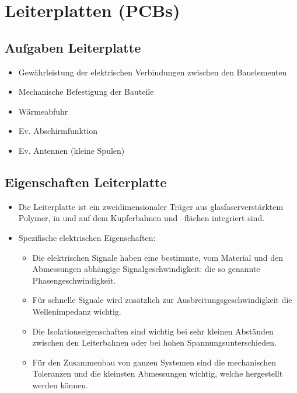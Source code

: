 \section{Leiterplatten (PCBs)}
\subsection{Aufgaben Leiterplatte}
\begin{itemize}
  \item Gewährleistung der elektrischen Verbindungen zwischen den Bauelementen
  \item Mechanische Befestigung der Bauteile
  \item Wärmeabfuhr
  \item Ev. Abschirmfunktion
  \item Ev. Antennen (kleine Spulen)
\end{itemize}

\subsection{Eigenschaften Leiterplatte}
\begin{itemize}
  \item Die Leiterplatte ist ein zweidimensionaler Träger aus
  glasfaserverstärktem Polymer, in und auf dem Kupferbahnen und –flächen
  integriert sind.
  \item Spezifische elektrischen Eigenschaften:
  \begin{itemize}
    \item Die elektrischen Signale haben eine bestimmte, vom Material und den
    Abmessungen abhängige Signalgeschwindigkeit: die so genannte
    Phasengeschwindigkeit.
    \item Für schnelle Signale wird zusätzlich zur Ausbreitungsgeschwindigkeit
    die Wellenimpedanz wichtig.
    \item Die Isolationseigenschaften sind wichtig bei sehr kleinen Abständen
    zwischen den Leiterbahnen oder bei hohen Spannungsunterschieden.
    \item Für den Zusammenbau von ganzen Systemen sind die mechanischen
    Toleranzen und die kleinsten Abmessungen wichtig, welche hergestellt werden
    können.
    \end{itemize}
\end{itemize}

